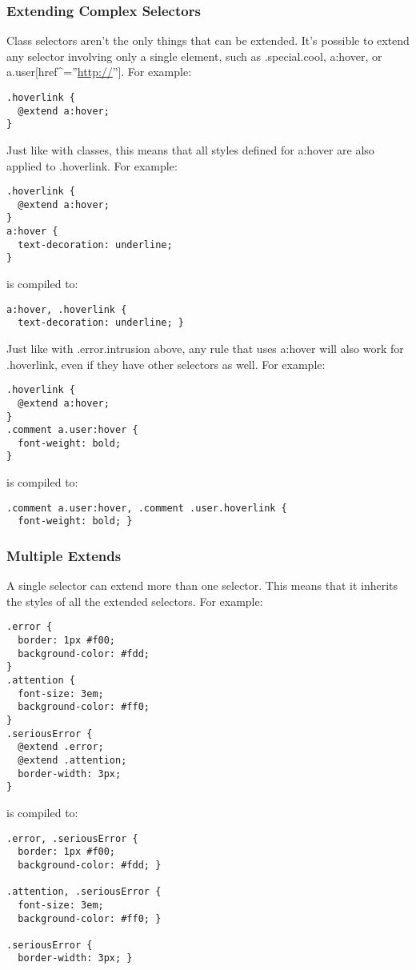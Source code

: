 \documentclass[9pt]{article}
\begin{document}
\subsubsection{Extending Complex Selectors}


 Class selectors aren’t the only things that can be extended. It’s possible to extend any selector involving only a single element, such as .special.cool, a:hover, or a.user[href\^{}=''\url{http://}'']. For example:
\begin{verbatim}
.hoverlink {
  @extend a:hover;
}
\end{verbatim}


 Just like with classes, this means that all styles defined for a:hover are also applied to .hoverlink. For example:
\begin{verbatim}
.hoverlink {
  @extend a:hover;
}
a:hover {
  text-decoration: underline;
}
\end{verbatim}


 is compiled to:
\begin{verbatim}
a:hover, .hoverlink {
  text-decoration: underline; }
\end{verbatim}


 Just like with .error.intrusion above, any rule that uses a:hover will also work for .hoverlink, even if they have other selectors as well. For example:
\begin{verbatim}
.hoverlink {
  @extend a:hover;
}
.comment a.user:hover {
  font-weight: bold;
}
\end{verbatim}


 is compiled to:
\begin{verbatim}
.comment a.user:hover, .comment .user.hoverlink {
  font-weight: bold; }
\end{verbatim}
\subsubsection{Multiple Extends}


 A single selector can extend more than one selector. This means that it inherits the styles of all the extended selectors. For example:
\begin{verbatim}
.error {
  border: 1px #f00;
  background-color: #fdd;
}
.attention {
  font-size: 3em;
  background-color: #ff0;
}
.seriousError {
  @extend .error;
  @extend .attention;
  border-width: 3px;
}
\end{verbatim}


 is compiled to:
\begin{verbatim}
.error, .seriousError {
  border: 1px #f00;
  background-color: #fdd; }

.attention, .seriousError {
  font-size: 3em;
  background-color: #ff0; }

.seriousError {
  border-width: 3px; }
\end{verbatim}
\end{document}
